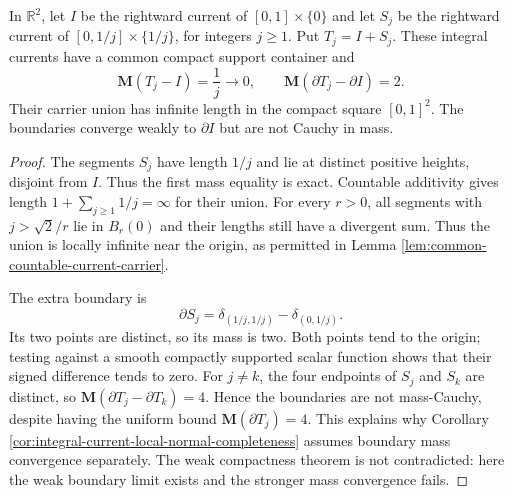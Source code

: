 \begin{example}\label{ex:mass-convergence-infinite-carrier-union}
In $\mathbb R^2$, let $I$ be the rightward current of $[0,1]\times\{0\}$ and let $S_j$ be the rightward current of $[0,1/j]\times\{1/j\}$, for integers $j\geq1$. Put $T_j=I+S_j$. These integral currents have a common compact support container and
\[
 \mathbf M(T_j-I)=\frac1j\longrightarrow0,
 \qquad \mathbf M(\partial T_j-\partial I)=2.
\]
Their carrier union has infinite length in the compact square $[0,1]^2$. The boundaries converge weakly to $\partial I$ but are not Cauchy in mass.
\end{example}
\begin{proof}
The segments $S_j$ have length $1/j$ and lie at distinct positive heights, disjoint from $I$. Thus the first mass equality is exact. Countable additivity gives length $1+\sum_{j\geq1}1/j=\infty$ for their union. For every $r>0$, all segments with $j>\sqrt2/r$ lie in $B_r(0)$ and their lengths still have a divergent sum. Thus the union is locally infinite near the origin, as permitted in Lemma \ref{lem:common-countable-current-carrier}.

The extra boundary is
\[
 \partial S_j=\delta_{(1/j,1/j)}-\delta_{(0,1/j)}.
\]
Its two points are distinct, so its mass is two. Both points tend to the origin; testing against a smooth compactly supported scalar function shows that their signed difference tends to zero. For $j\ne k$, the four endpoints of $S_j$ and $S_k$ are distinct, so $\mathbf M(\partial T_j-\partial T_k)=4$. Hence the boundaries are not mass-Cauchy, despite having the uniform bound $\mathbf M(\partial T_j)=4$. This explains why Corollary \ref{cor:integral-current-local-normal-completeness} assumes boundary mass convergence separately. The weak compactness theorem is not contradicted: here the weak boundary limit exists and the stronger mass convergence fails.
\end{proof}
